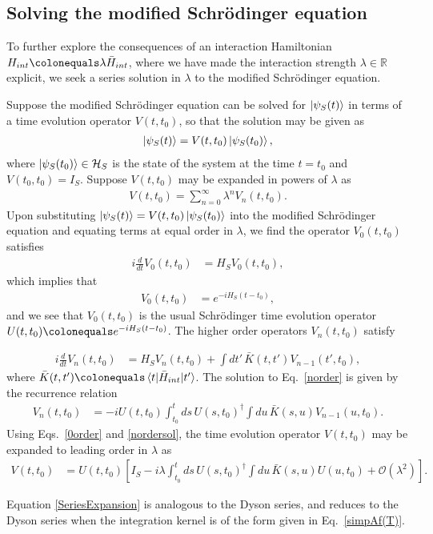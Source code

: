 \documentclass[a4paper,twocolumn,superscriptaddress,11pt,accepted=2019-06-04]{quantumarticle}
\newcommand{\ce}{\colonequals}
\newcommand{\nn}{\nonumber}		%
\begin{document}
{\subsection{Solving the modified Schr\"{o}dinger equation}

{To further explore the consequences of an interaction Hamiltonian $H_{int} \ce \lambda \bar{H}_{int}$, where we have made the interaction strength $\lambda\in\mathbb{R}$ explicit, we seek a series solution in $\lambda$ to the modified Schr\"{o}dinger equation.}

Suppose the modified Schr\"{o}dinger equation can be solved for $\ket{\psi_S(t)}$ in terms of a time evolution operator $V(t,t_0)$, so that the solution may be given as
\begin{align}
\ket{\psi_S(t)} = V(t,t_0) \ket{\psi_S(t_0)}, \nn %
 \end{align}
 where $\ket{\psi_S(t_0)} \in \mathcal{H}_S$ is the state of the system at the time $t=t_0$ and $V(t_0,t_0) = I_S$. Suppose $V(t,t_0)$ may be expanded in powers of $\lambda$ as
\begin{align}
 V(t,t_0) = \sum_{n=0}^\infty \lambda^n V_n(t,t_0). \nn
\end{align}
Upon substituting $\ket{\psi_S(t)} = V(t,t_0) \ket{\psi_S(t_0)}$ into the modified Schr\"{o}dinger equation and equating terms at equal order in $\lambda$, we find the operator $V_0(t,t_0)$ satisfies
\begin{align}
i \frac{d}{dt} V_0(t,t_0) &= H_S V_0(t,t_0),\nn\end{align}
which implies that
\begin{align}
V_0(t,t_0) &= e^{-iH_S (t-t_0)}, \label{0order}
\end{align}
and we see that $V_0(t,t_0)$ is the usual Schr\"{o}dinger time evolution operator $U(t,t_0) \ce e^{-iH_S (t-t_0)}$.  The higher order operators $V_n(t,t_0)$ satisfy
\begin{widetext}
 \begin{align}
i \frac{d}{dt} V_n(t,t_0) &= H_S V_n(t,t_0)  +  \int dt' \, \bar{K}(t,t')  V_{n-1}(t',t_0), \label{norder}
\end{align}
where $\bar{K}(t,t') \ce \braket{t| \bar{H}_{int} | t '}$.  The solution to Eq.~\eqref{norder}  is  given by the recurrence relation
\begin{align}
V_n(t,t_0) &=  -i   U(t,t_0) \int_{t_0}^{t} ds \, U(s,t_0)^\dagger  \int du \, \bar{K}(s,u) V_{n-1}(u,t_0). \label{nordersol}
\end{align}
Using Eqs.~\eqref{0order}  and \eqref{nordersol}, the time evolution operator $V(t,t_0)$ may be expanded to leading order in $\lambda$ as
\begin{align}
V(t,t_0)
&= U(t,t_0)\left[ I_S   -i \lambda  \int_{t_0}^{t} ds \, U(s,t_0)^\dagger  \int du \, \bar{K}(s,u) U(u,t_0) + \mathcal{O}\!\left(\lambda^2\right)\right].  \label{SeriesExpansion}
\end{align}
\end{widetext}
Equation \eqref{SeriesExpansion} is analogous to the Dyson series, and reduces to the Dyson series when the integration kernel is of the form given in Eq.~\eqref{simpAf(T)}.

}
\end{document}
